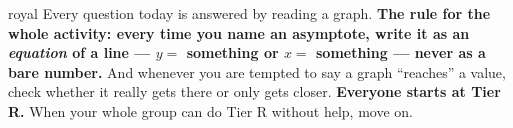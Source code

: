 \documentclass[10pt]{article}
\begin{document}

\vspace{0.15in}

\begin{scenariobox}{royal}
\small
Every question today is answered by reading a graph. \textbf{The rule for the whole activity: every
time you name an asymptote, write it as an \emph{equation} of a line --- $y=$ something or $x=$
something --- never as a bare number.} And whenever you are tempted to say a graph ``reaches'' a
value, check whether it really gets there or only gets closer. \textbf{Everyone starts at Tier R.}
When your whole group can do Tier R without help, move on.
\end{scenariobox}

\vspace{0.10in}
\end{document}
